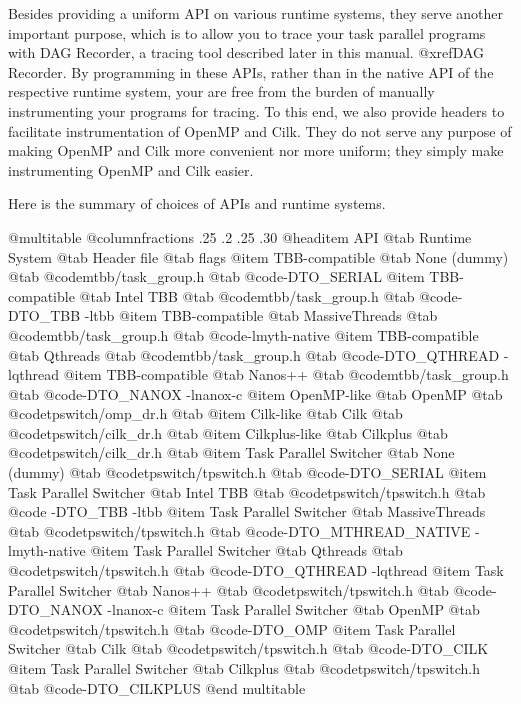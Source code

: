 Besides providing a uniform API on various runtime systems, they serve
another important purpose, which is to allow you to trace your task
parallel programs with DAG Recorder, a tracing tool described later in
this manual. @xref{DAG Recorder}. By programming in these APIs, rather
than in the native API of the respective runtime system, your are free
from the burden of manually instrumenting your programs for tracing.  To
this end, we also provide headers to facilitate instrumentation of
OpenMP and Cilk.  They do not serve any purpose of making OpenMP and
Cilk more convenient nor more uniform; they simply make instrumenting
OpenMP and Cilk easier.

Here is the summary of choices of APIs and runtime systems.

@multitable @columnfractions .25 .2 .25 .30
@headitem API            @tab Runtime System  @tab Header file      @tab flags
@item     TBB-compatible @tab None (dummy)   @tab @code{mtbb/task_group.h} @tab @code{-DTO_SERIAL}
@item     TBB-compatible @tab Intel TBB      @tab @code{mtbb/task_group.h} @tab @code{-DTO_TBB -ltbb}
@item     TBB-compatible @tab MassiveThreads @tab @code{mtbb/task_group.h} @tab @code{-lmyth-native}
@item     TBB-compatible @tab Qthreads       @tab @code{mtbb/task_group.h} @tab @code{-DTO_QTHREAD -lqthread}
@item     TBB-compatible @tab Nanos++        @tab @code{mtbb/task_group.h} @tab @code{-DTO_NANOX -lnanox-c}
@item     OpenMP-like    @tab OpenMP @tab @code{tpswitch/omp_dr.h}          @tab
@item     Cilk-like      @tab Cilk   @tab @code{tpswitch/cilk_dr.h}         @tab
@item     Cilkplus-like  @tab Cilkplus   @tab @code{tpswitch/cilk_dr.h}         @tab
@item     Task Parallel Switcher @tab None (dummy) @tab @code{tpswitch/tpswitch.h} @tab @code{-DTO_SERIAL}
@item     Task Parallel Switcher @tab Intel TBB @tab @code{tpswitch/tpswitch.h} @tab @code{ -DTO_TBB -ltbb}
@item     Task Parallel Switcher @tab MassiveThreads @tab @code{tpswitch/tpswitch.h} @tab @code{-DTO_MTHREAD_NATIVE -lmyth-native}
@item     Task Parallel Switcher @tab Qthreads @tab @code{tpswitch/tpswitch.h} @tab @code{-DTO_QTHREAD -lqthread}
@item     Task Parallel Switcher @tab Nanos++ @tab @code{tpswitch/tpswitch.h} @tab @code{-DTO_NANOX -lnanox-c}
@item     Task Parallel Switcher @tab OpenMP @tab @code{tpswitch/tpswitch.h} @tab @code{-DTO_OMP}
@item     Task Parallel Switcher @tab Cilk @tab @code{tpswitch/tpswitch.h} @tab @code{-DTO_CILK}
@item     Task Parallel Switcher @tab Cilkplus @tab @code{tpswitch/tpswitch.h} @tab @code{-DTO_CILKPLUS}
@end multitable

